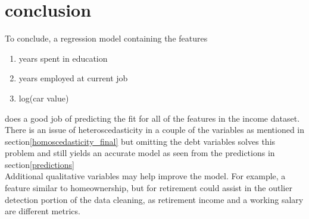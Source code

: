 \documentclass[journal]{IEEEtran}
\begin{document}
\section{conclusion}
\indent
To conclude, a regression model containing the features 
\begin{enumerate}
    \item years spent in education
    \item years employed at current job 
    \item log(car value)
\end{enumerate}
does a good job of predicting the fit for all of the features in the income dataset. There is an issue of heteroscedasticity in a couple of the variables as mentioned in section\ref{homoscedasticity_final} but omitting the debt variables solves this problem and still yields an accurate model as seen from the predictions in section\ref{predictions}\\
\indent
Additional qualitative variables may help improve the model. For example, a feature similar to homeownership, but for retirement could assist in the outlier detection portion of the data cleaning, as retirement income and a working salary are different metrics. \\

%
%
\printbibliography
\end{document}
